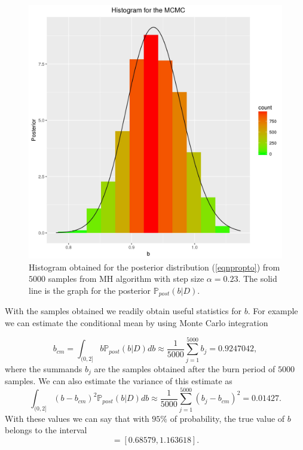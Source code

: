 \documentclass[12pt]{book}
\newcommand{\post}{\mathbb{P}_{post}}
\begin{document}
\begin{figure}[H]
\centering
\includegraphics[scale=0.50]{./FigChap3/histogram_mcmc.jpg}
\caption{Histogram obtained for the posterior distribution (\ref{eqnpropto}) 
from $5000$ samples from MH algorithm with step size $\alpha=0.23$. The solid line
is the  graph for the posterior $\post(b|D)$.}
\end{figure}

With the samples obtained we readily obtain useful statistics for $b$. For example we can estimate
 the conditional mean  by using Monte Carlo integration

\begin{equation}\label{eqnbcmMC}
b_{cm}=\int_{(0,2]}b\post(b|D)db\approx\frac{1}{5000}\sum_{j=1}^{5000}b_{j}=0.9247042,
\end{equation}
where the summands $b_{j}$ are the samples obtained after the burn period of $5000$ samples. We can 
also estimate the variance of this estimate as 
\begin{equation*}
\int_{(0,2]}(b-b_{cm})^{2}\post(b|D)db\approx\frac{1}{5000}\sum_{j=1}^{5000}(b_{j}-b_{cm})^{2}=0.01427.
\end{equation*}
With these values we can say that with $95\%$ of probability, the true value of $b$ belongs to the
interval
\begin{equation*}
[0.9247042-2\sqrt{0.01427},0.92470422+2\sqrt{0.01427}]=[0.68579,1.163618].
\end{equation*}
\end{document}
